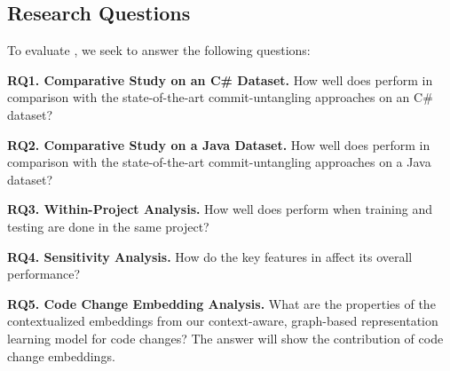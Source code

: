 \subsection{Research Questions}

To evaluate {\tool}, we seek to answer the following questions:

\noindent\textbf{RQ1. Comparative Study on an C\# Dataset.}  How well
does {\tool} perform in comparison with the state-of-the-art
commit-untangling approaches on an C\# dataset?

\noindent\textbf{RQ2. Comparative Study on a Java Dataset.}  How well
does {\tool} perform in comparison with the state-of-the-art
commit-untangling approaches on a Java dataset?

\noindent\textbf{RQ3. Within-Project Analysis.}  How well does {\tool}
perform when training and testing are done in the same project?


\noindent\textbf{RQ4. Sensitivity Analysis.} How do the key features
in {\tool} affect its overall performance?

\noindent\textbf{RQ5. Code Change Embedding Analysis.} What are the
properties of the contextualized embeddings from our
context-aware, graph-based representation learning model for code
changes? The answer will show the contribution of code change embeddings.

